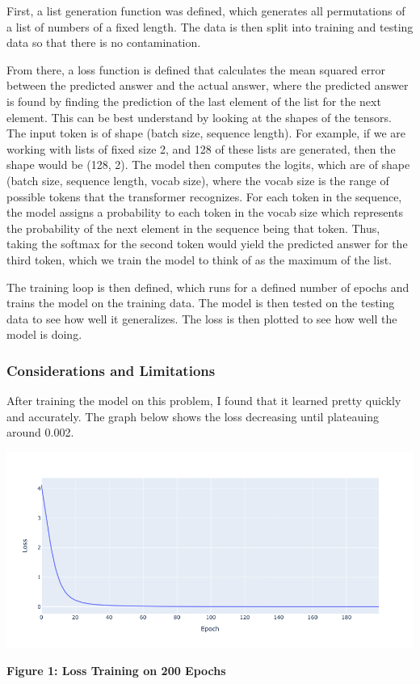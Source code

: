 \documentclass{article}
\begin{document}
First, a list generation function was defined, which generates all permutations of a list of numbers of a fixed length. The data is then split into training and testing data so that there is no contamination. 

From there, a loss function is defined that calculates the mean squared error between the predicted answer and the actual answer, where the predicted answer is found by finding the prediction of the last element of the list for the next element. This can be best understand by looking at the shapes of the tensors. The input token is of shape (batch size, sequence length). For example, if we are working with lists of fixed size 2, and 128 of these lists are generated, then the shape would be (128, 2). The model then computes the logits, which are of shape (batch size, sequence length, vocab size), where the vocab size is the range of possible tokens that the transformer recognizes. For each token in the sequence, the model assigns a probability to each token in the vocab size which represents the probability of the next element in the sequence being that token. Thus, taking the softmax for the second token would yield the predicted answer for the third token, which we train the model to think of as the maximum of the list.

The training loop is then defined, which runs for a defined number of epochs and trains the model on the training data. The model is then tested on the testing data to see how well it generalizes. The loss is then plotted to see how well the model is doing.

\subsubsection{Considerations and Limitations}
After training the model on this problem, I found that it learned pretty quickly and accurately. The graph below shows the loss decreasing until plateauing around 0.002. 
\begin{center}
    \includegraphics[scale=0.4]{fixed_length.png}

    \textbf{Figure 1: Loss Training on 200 Epochs}
\end{center}
\end{document}
